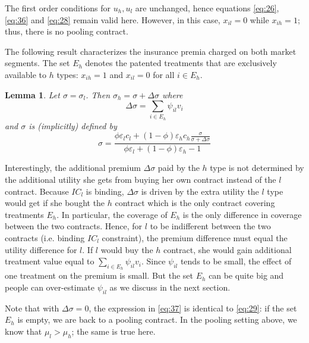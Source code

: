 \documentclass[a4paper,12pt]{article}
\newtheorem{lemma}{Lemma}
\begin{document}
The first order conditions for \(u_h,u_l\) are unchanged, hence equations \eqref{eq:26}, \eqref{eq:36} and \eqref{eq:28} remain valid here. However, in this case, \(x_{il}=0\) while \(x_{ih}=1\); thus, there is no pooling contract.

The following result characterizes the insurance premia charged on both market segments. The set \(E_h\) denotes the patented treatments that are exclusively available to \(h\) types: \(x_{ih}=1\) and \(x_{il}=0\) for all \(i \in E_h\).

\begin{lemma}
\label{Linear_pricing_premium}
Let \(\sigma=\sigma_l\). Then \(\sigma_h=\sigma+\Delta \sigma\) where
\begin{equation}
\label{eq:52}
\Delta \sigma = \sum_{i \in E_h} \psi_{il} v_i
\end{equation}
and \(\sigma\) is (implicitly) defined by
\begin{equation}
\label{eq:37}
\sigma = \frac{\phi \varepsilon_l c_l +(1-\phi) \varepsilon_h c_h \frac{\sigma}{\sigma + \Delta \sigma} }{\phi \varepsilon_l +(1-\phi) \varepsilon_h-1}
\end{equation}
\end{lemma}

Interestingly, the additional premium \(\Delta \sigma\) paid by the \(h\) type is not determined by the additional utility she gets from buying her own contract instead of the \(l\) contract. Because \(IC_l\) is binding, \(\Delta \sigma\) is driven by the extra utility the \(l\) type would get if she bought the \(h\) contract which is the only contract covering treatments \(E_h\). In particular, the coverage of \(E_h\) is the only difference in coverage between the two contracts. Hence, for \(l\) to be indifferent between the two contracts (i.e. binding \(IC_l\) constraint), the premium difference must equal the utility difference for \(l\). If \(l\) would buy the \(h\) contract, she would gain additional treatment value equal to \(\sum_{i \in E_h} \psi_{il} v_i\). Since \(\psi_{il}\) tends to be small, the effect of one treatment on the premium is small. But the set \(E_h\) can be quite big and people can over-estimate \(\psi_{il}\) as we discuss in the next section.

Note that with \(\Delta \sigma =0\), the expression in \eqref{eq:37} is identical to \eqref{eq:29}: if the set \(E_h\) is empty, we are back to a pooling contract. In the pooling setting above, we know that \(\mu_l>\mu_h\); the same is true here.
\end{document}
